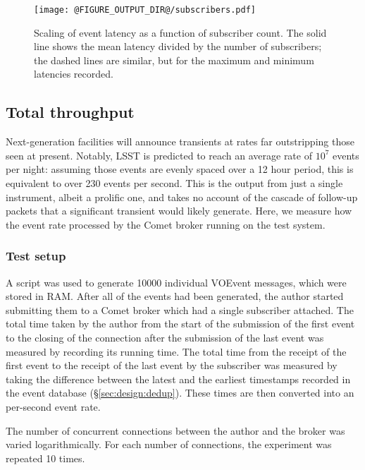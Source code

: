 \documentclass[5p,authoryear]{elsarticle}
\begin{document}
\begin{figure}
  \begin{center}
  \texttt{[image: @FIGURE\_OUTPUT\_DIR@/subscribers.pdf]}
  \end{center}

  \caption{Scaling of event latency as a function of subscriber count. The
  solid line shows the mean latency divided by the number of subscribers; the
  dashed lines are similar, but for the maximum and minimum latencies
  recorded.}

  \label{fig:subscribers}
\end{figure}


\subsection{Total throughput}
\label{sec:perf:total}

Next-generation facilities will announce transients at rates far outstripping
those seen at present. Notably, LSST is predicted to reach an average rate of
$10^7$ events per night: assuming those events are evenly spaced over a 12
hour period, this is equivalent to over 230 events per second. This is the
output from just a single instrument, albeit a prolific one, and takes no
account of the cascade of follow-up packets that a significant transient would
likely generate. Here, we measure how the event rate processed by the Comet
broker running on the test system.

\subsubsection{Test setup}
\label{sec:perf:total:setup}

A script was used to generate 10000 individual VOEvent messages, which were
stored in RAM\@. After all of the events had been generated, the author
started submitting them to a Comet broker which had a single subscriber
attached. The total time taken by the author from the start of the submission
of the first event to the closing of the connection after the submission of
the last event was measured by recording its running time. The total time from
the receipt of the first event to the receipt of the last event by the
subscriber was measured by taking the difference between the latest and the
earliest timestamps recorded in the event database (\S\ref{sec:design:dedup}).
These times are then converted into an per-second event rate.

The number of concurrent connections between the author and the broker was
varied logarithmically. For each number of connections, the experiment was
repeated 10 times.
\end{document}
